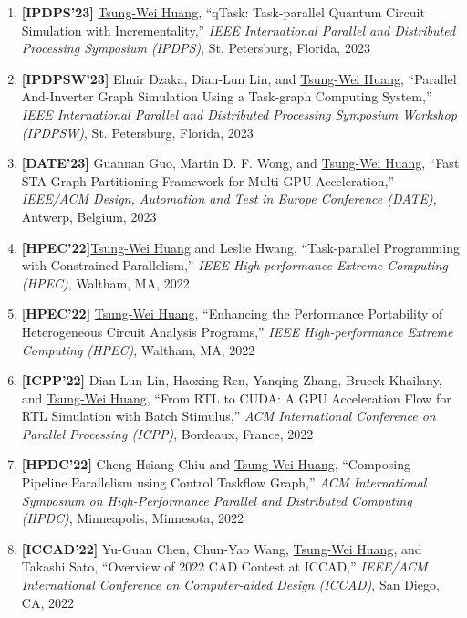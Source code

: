 \documentclass[A4,11pt]{article}
\begin{document}
\begin{enumerate}
    \item \textbf{[IPDPS'23]} \underline{Tsung-Wei Huang}, ``qTask: Task-parallel Quantum Circuit Simulation with Incrementality,'' \textit{IEEE International Parallel and Distributed Processing Symposium (IPDPS)}, St. Petersburg, Florida, 2023 

    \item \textbf{[IPDPSW'23]} Elmir Dzaka, Dian-Lun Lin, and \underline{Tsung-Wei Huang}, ``Parallel And-Inverter Graph Simulation Using a Task-graph Computing System,'' \textit{IEEE International Parallel and Distributed Processing Symposium Workshop (IPDPSW)}, St. Petersburg, Florida, 2023 

    \item \textbf{[DATE'23]} Guannan Guo, Martin D. F. Wong, and \underline{Tsung-Wei Huang}, ``Fast STA Graph Partitioning Framework for Multi-GPU Acceleration,'' \textit{IEEE/ACM Design, Automation and Test in Europe Conference (DATE)}, Antwerp, Belgium, 2023
    \item \textbf{[HPEC'22]}\underline{Tsung-Wei Huang} and Leslie Hwang, ``Task-parallel Programming with Constrained Parallelism,'' \textit{IEEE High-performance Extreme Computing (HPEC)}, Waltham, MA, 2022

    \item \textbf{[HPEC'22]} \underline{Tsung-Wei Huang}, ``Enhancing the Performance Portability of Heterogeneous Circuit Analysis Programs,'' \textit{IEEE High-performance Extreme Computing (HPEC)}, Waltham, MA, 2022

    \item \textbf{[ICPP'22]} Dian-Lun Lin, Haoxing Ren, Yanqing Zhang, Brucek Khailany, and \underline{Tsung-Wei Huang}, ``From RTL to CUDA: A GPU Acceleration Flow for RTL Simulation with Batch Stimulus,'' \textit{ACM International Conference on Parallel Processing (ICPP)}, Bordeaux, France, 2022

    \item \textbf{[HPDC'22]} Cheng-Hsiang Chiu and \underline{Tsung-Wei Huang}, ``Composing Pipeline Parallelism using Control Taskflow Graph,'' \textit{ACM International Symposium on High-Performance Parallel and Distributed Computing (HPDC)}, Minneapolis, Minnesota, 2022

    \item \textbf{[ICCAD'22]} Yu-Guan Chen, Chun-Yao Wang, \underline{Tsung-Wei Huang}, and Takashi Sato, ``Overview of 2022 CAD Contest at ICCAD,'' \textit{IEEE/ACM International Conference on Computer-aided Design (ICCAD)}, San Diego, CA, 2022


\end{enumerate}
\end{document}
